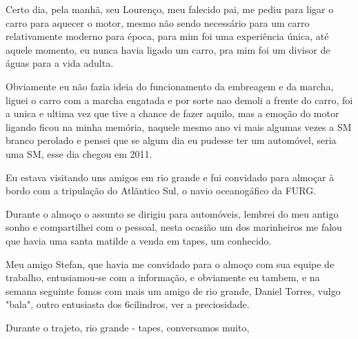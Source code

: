 \documentclass[a4paper]{report}
\begin{document}
Certo dia, pela manh\~a, seu Louren\c{c}o, meu falecido pai, me pediu para ligar o carro para aquecer o motor,
mesmo n\~ao sendo necess\'ario para um carro relativamente moderno para \'epoca, para mim foi uma experi\^encia \'unica,
at\'e aquele momento, eu nunca havia ligado um carro, pra mim foi um divisor de \'aguas para a vida adulta.

Obviamente eu n\~ao fazia ideia do funcionamento da embreagem e da marcha, liguei o carro com a marcha engatada e por sorte
nao demoli a frente do carro, foi a unica e ultima vez que tive a chance de fazer aquilo, mas a emo\c{c}\~ao do motor ligando ficou
na minha mem\'oria, naquele mesmo ano vi mais algumas vezes a SM branco perolado e pensei que se algum dia eu pudesse ter um
autom\'ovel, seria uma SM, esse dia chegou em 2011.

Eu estava visitando uns amigos em rio grande e fui convidado para almo\c{c}ar \`a bordo com a tripula\c{c}\~ao do Atl\~antico Sul, o navio
oceanog\'afico da FURG.

Durante o almo\c{c}o o assunto se dirigiu para autom\'oveis, lembrei do meu antigo sonho e compartilhei com o pessoal, nesta ocasi\~ao um dos marinheiros
me falou que havia uma santa matilde a venda em tapes, um conhecido.

Meu amigo Stefan, que havia me convidado para o almo\c{c}o com sua equipe de trabalho, entusiamou-se com a informa\c{c}\~ao, e obviamente eu tambem, e na semana 
seguinte fomos com mais um amigo de rio grande, Daniel Torres, vulgo "bala", outro entusiasta dos 6cilindros, ver a preciosidade.

Durante o trajeto, rio grande - tapes, conversamos muito,   
\end{document}
